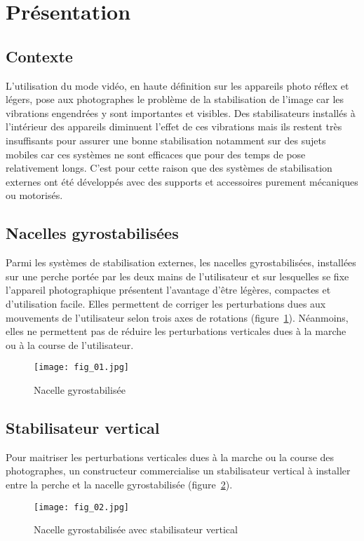 \section{Présentation}
\ifprof
\else
\subsection{Contexte}
L'utilisation du mode vidéo, en haute définition sur les appareils photo réflex et légers, pose aux photographes le problème de la stabilisation de l'image car les vibrations engendrées y sont importantes et visibles. Des stabilisateurs installés à l'intérieur des appareils diminuent l'effet de ces vibrations mais ils restent très insuffisants pour assurer une bonne stabilisation notamment sur des sujets mobiles car ces systèmes ne sont efficaces que pour des temps de pose relativement longs. C'est pour cette raison que des systèmes de stabilisation externes ont été développés avec des supports et accessoires purement mécaniques ou motorisés.

\subsection{Nacelles gyrostabilisées}
Parmi les systèmes de stabilisation externes, les nacelles gyrostabilisées, installées sur une perche portée par les deux mains de l'utilisateur et sur lesquelles se fixe l'appareil photographique présentent l'avantage d'être légères, compactes et d'utilisation facile. Elles permettent de corriger les perturbations dues aux mouvements de l'utilisateur selon trois axes de rotations (figure~\ref{fig:01}). Néanmoins, elles ne permettent pas de réduire les perturbations verticales dues à la marche ou à la course de l'utilisateur.

\begin{figure}[H]
\centering
\texttt{[image: fig\_01.jpg]}
\caption{\label{fig:01} Nacelle gyrostabilisée}
\end{figure}


\subsection{Stabilisateur vertical}
Pour maitriser les perturbations verticales dues à la marche ou la course des photographes, un constructeur commercialise un stabilisateur vertical à installer entre la perche et la nacelle gyrostabilisée (figure~\ref{fig:02}).

\begin{figure}[H]
\centering
\texttt{[image: fig\_02.jpg]}
\caption{\label{fig:02} Nacelle gyrostabilisée avec stabilisateur vertical}
\end{figure}


